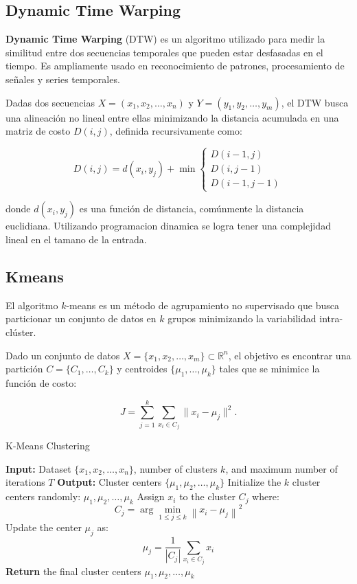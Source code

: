 \documentclass[titlepage,a4paper]{article}
\begin{document}
\subsection{Dynamic Time Warping}
\textbf{Dynamic Time Warping} (DTW) es un algoritmo utilizado para medir la similitud entre dos secuencias temporales que pueden estar desfasadas en el tiempo. Es ampliamente usado en reconocimiento de patrones, procesamiento de señales y series temporales.

Dadas dos secuencias \( X = (x_1, x_2, \dots, x_n) \) y \( Y = (y_1, y_2, \dots, y_m) \), el DTW busca una alineación no lineal entre ellas minimizando la distancia acumulada en una matriz de costo \( D(i,j) \), definida recursivamente como:

\[
D(i,j) = d(x_i, y_j) + \min 
\begin{cases}
    D(i-1, j) \\
    D(i, j-1) \\
    D(i-1, j-1)
\end{cases}
\]

donde \( d(x_i, y_j) \) es una función de distancia, comúnmente la distancia euclidiana. Utilizando programacion dinamica se logra tener una complejidad lineal en el tamano de la entrada.

\subsection{Kmeans}
El algoritmo \( k \)-means es un método de agrupamiento no supervisado que busca particionar un conjunto de datos en \( k \) grupos minimizando la variabilidad intra-clúster.



Dado un conjunto de datos \( X = \{x_1, x_2, \dots, x_m\} \subset \mathbb{R}^n \), el objetivo es encontrar una partición \( C = \{C_1, \dots, C_k\} \) y centroides \( \{\mu_1, \dots, \mu_k\} \) tales que se minimice la función de costo:

\[
J = \sum_{j=1}^{k} \sum_{x_i \in C_j} \|x_i - \mu_j\|^2.
\]

\begin{algorithm}
\caption{K-Means Clustering}
\begin{algorithmic}[1]
\State \textbf{Input:} Dataset $\{x_1, x_2, \dots, x_n\}$, number of clusters $k$, and maximum number of iterations $T$
\State \textbf{Output:} Cluster centers $\{\mu_1, \mu_2, \dots, \mu_k\}$
\State Initialize the $k$ cluster centers randomly: $\mu_1, \mu_2, \dots, \mu_k$
        \State Assign $x_i$ to the cluster $C_j$ where:
        \[
        C_j = \arg \min_{1 \leq j \leq k} \left\| x_i - \mu_j \right\|^2
        \]
    \EndFor
        \State Update the center $\mu_j$ as:
        \[
        \mu_j = \frac{1}{|C_j|} \sum_{x_i \in C_j} x_i
        \]
    \EndFor
\EndFor
\State \textbf{Return} the final cluster centers $\mu_1, \mu_2, \dots, \mu_k$
\end{algorithmic}
\end{algorithm}
\end{document}
